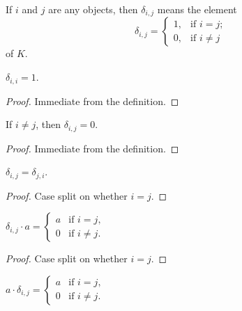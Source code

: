 \begin{definition}
\label{def.kron-delta}
\leantarget
\leanok
If $i$ and $j$ are any objects, then $\delta_{i,j}$ means the element
\[
\delta_{i,j} =
\begin{cases}
1, & \text{if } i = j; \\
0, & \text{if } i \neq j
\end{cases}
\]
of $K$.
\end{definition}

\begin{lemma}
\label{lem.kron-delta.self}
\leanhelper
\leanok
$\delta_{i,i} = 1$.
\end{lemma}

\begin{proof}
\leanok
Immediate from the definition.
\end{proof}

\begin{lemma}
\label{lem.kron-delta.ne}
\leanhelper
\leanok
If $i \neq j$, then $\delta_{i,j} = 0$.
\end{lemma}

\begin{proof}
\leanok
Immediate from the definition.
\end{proof}

\begin{lemma}
\label{lem.kron-delta.comm}
\leanhelper
\leanok
$\delta_{i,j} = \delta_{j,i}$.
\end{lemma}

\begin{proof}
\leanok
Case split on whether $i = j$.
\end{proof}

\begin{lemma}
\label{lem.kron-delta.mul-left}
\leanhelper
\leanok
$\delta_{i,j} \cdot a = \begin{cases} a & \text{if } i = j, \\ 0 & \text{if } i \neq j. \end{cases}$
\end{lemma}

\begin{proof}
\leanok
Case split on whether $i = j$.
\end{proof}

\begin{lemma}
\label{lem.kron-delta.mul-right}
\leanhelper
\leanok
$a \cdot \delta_{i,j} = \begin{cases} a & \text{if } i = j, \\ 0 & \text{if } i \neq j. \end{cases}$
\end{lemma}

